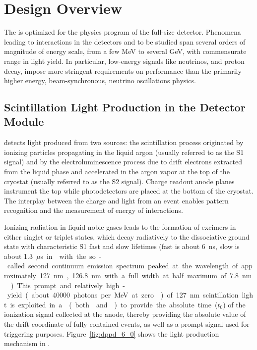 \section{Design Overview}
\label{sec:dp-pds-overview}

The \dual {} is optimized for the physics program of the full-size \dune \dual detector. Phenomena leading to interactions in the  detectors and to be studied span several orders of magnitude of energy scale, from a few \si{MeV} to several \si{GeV}, with commensurate range in light yield. In particular, low-energy signals like  neutrinos, and proton decay, impose more stringent requirements on  performance than the primarily higher energy, beam-synchronous, neutrino oscillations physics.



\subsection{Scintillation Light Production in the \dual Detector Module}
\label{sec:dp-pds-overview_scintillation}

\dual {} detects light produced from two sources: the scintillation process originated by ionizing particles propagating in the liquid argon (usually referred to as the S1 signal) and by the electroluminescence process due to drift electrons extracted from the liquid phase and accelerated in the argon vapor at the top of the cryostat (usually referred to as the S2 signal). Charge readout anode planes instrument the top while photodetectors are placed at the bottom of the cryostat. The interplay between the charge and light from an event enables pattern recognition and the measurement of energy of interactions.

Ionizing radiation in liquid noble gases leads to the formation of excimers in either singlet or triplet states, which decay radiatively to the dissociative ground state with characteristic S1 fast and slow lifetimes (fast is about \SI{6}{ns}, slow is about \SI{1.3}{$\mu$s} in \lar with the so-called second continuum emission spectrum peaked at the wavelength of approximately \SI{127}{nm}, \SI{126.8}{nm} with a full width at half maximum of \SI{7.8}{nm} \cite{Heindl}). This prompt and relatively high-yield (about \num{40000} photons per \si{MeV} at zero \efield) of \SI{127}{nm} scintillation light is exploited in a \lartpc (both  and ) to provide the absolute time ($t_0$) of the ionization signal collected at the anode, thereby providing the absolute value of the drift coordinate of fully contained events, as well as a prompt signal used for triggering purposes. Figure~\ref{fig:dppd_6_0} shows the light production mechanism in \lar.

